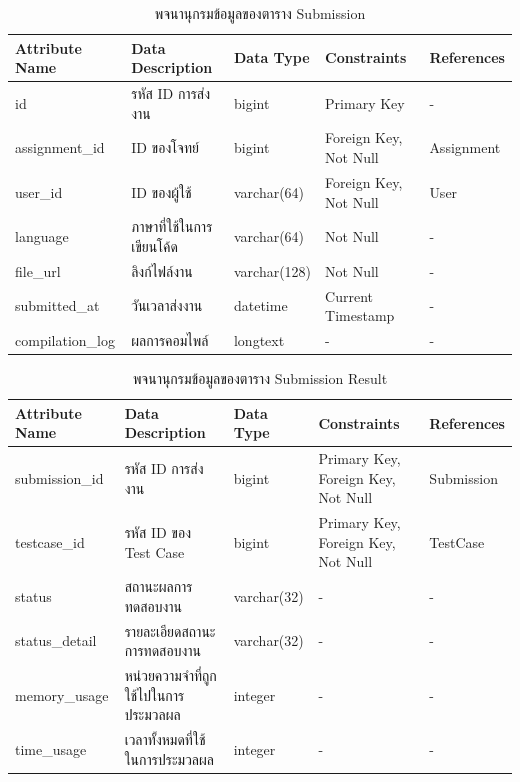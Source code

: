 \documentclass[12pt,one side,openright,a4paper]{cpe-thesis-th}
\begin{document}
\begin{table}[H]
  \centering
  \caption{พจนานุกรมข้อมูลของตาราง Submission}\label{tbl:data-dict-submission}
  \begin{tabular}{p{2cm}|p{4cm}p{2cm}p{3cm}p{2cm}} \hline\hline
    Attribute Name   & Data Description    & Data Type    & Constraints           & References \\ \hline\hline
    id               & รหัส ID การส่งงาน     & bigint       & Primary Key           & -          \\
    assignment\_id   & ID ของโจทย์          & bigint       & Foreign Key, Not Null & Assignment \\
    user\_id         & ID ของผู้ใช้           & varchar(64)  & Foreign Key, Not Null & User       \\
    language         & ภาษาที่ใช้ในการเขียนโค้ด & varchar(64)  & Not Null              & -          \\
    file\_url        & ลิงก์ไฟล์งาน           & varchar(128) & Not Null              & -          \\
    submitted\_at    & วันเวลาส่งงาน         & datetime     & Current Timestamp     & -          \\
    compilation\_log & ผลการคอมไพล์         & longtext     & -                     & -          \\ \hline\hline
  \end{tabular}
\end{table}
\begin{table}[H]
  \centering
  \caption{พจนานุกรมข้อมูลของตาราง Submission Result}
  \label{tbl:data-dict-submission_result}
  \begin{tabular}{p{2cm}|p{4cm}p{2cm}p{3cm}p{2cm}} \hline\hline
    Attribute Name & Data Description              & Data Type   & Constraints                        & References \\ \hline\hline
    submission\_id & รหัส ID การส่งงาน               & bigint      & Primary Key, Foreign Key, Not Null & Submission \\
    testcase\_id   & รหัส ID ของ Test Case          & bigint      & Primary Key, Foreign Key, Not Null & TestCase   \\
    status         & สถานะผลการทดสอบงาน            & varchar(32) & -                                  & -          \\
    status\_detail & รายละเอียดสถานะการทดสอบงาน     & varchar(32) & -                                  & -          \\
    memory\_usage  & หน่วยความจำที่ถูกใช้ไปในการประมวลผล & integer     & -                                  & -          \\
    time\_usage    & เวลาทั้งหมดที่ใช้ในการประมวลผล     & integer     & -                                  & -          \\ \hline\hline
  \end{tabular}
\end{table}
\end{document}
